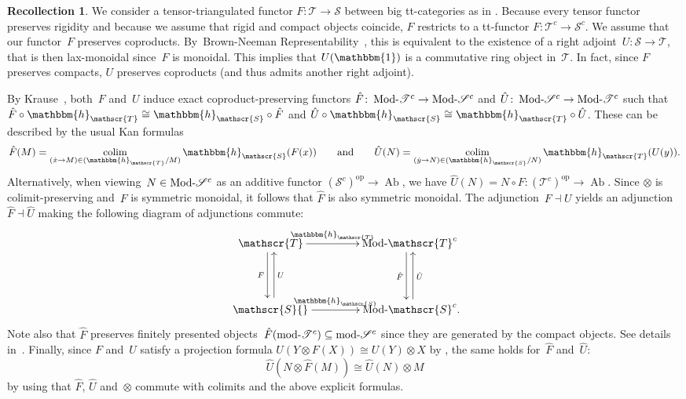 \documentclass[JEP,XML,SOM,Unicode]{cedram}
\numberwithin{equation}{section}
\theoremstyle{definition}
\newtheorem{Rec}[equation]{Recollection}
\DeclareMathOperator{\colim}{colim}
\DeclareMathOperator{\opname}{op}
\newcommand{\cat}[1]{\mathscr{#1}}
\newcommand{\op}{^{\opname}}
\newcommand{\unit}{\mathbbm{1}}
\DeclareMathOperator{\Ab}{Ab}
\DeclareMathOperator{\modname}{mod}
\DeclareMathOperator{\Mod}{Mod}
\newcommand{\adj}{\dashv}
\newcommand{\cS}{\cat{S}}
\newcommand{\cT}{\cat{T}}
\newcommand{\modd}{\modname\text{\!-}}
\newcommand{\Modd}{\Mod\text{\!-}}
\newcommand{\MS}{\Modd\cat S^c}
\newcommand{\mS}{\modd\cat S^c}
\newcommand{\MT}{\Modd\cat T^c}
\newcommand{\mT}{\modd\cat T^c}
\newcommand{\qquadtext}[1]{\qquad\text{#1}\qquad}
\newcommand{\vcorrect}[1]{{\vphantom{\vbox to #1em{}}}}
\newcommand{\yoneda}{\mathbbm{h}}
\begin{document}
\begin{Rec}
\label{Rec:T-S}
We consider a tensor-triangulated functor $F\colon \cT\to \cS$ between big tt-categories as in . Because every tensor functor preserves rigidity and because we assume that rigid and compact objects coincide, $F$ restricts to a tt\nobreakdash-functor $F\colon \cT^c\to \cS^c$. We assume that our functor~$F$ preserves coproducts. By~Brown-Neeman Representability~\cite{Neeman96}, this is equivalent to the existence of a right adjoint~$U\colon \cS\to \cT$, that is then lax-monoidal since~$F$ is monoidal. This implies that $U(\unit)$ is a commutative ring object in~$\cT$. In fact, since $F$ preserves compacts, $U$ preserves coproducts (and thus admits another right adjoint).

By Krause~\cite[Cor.\,2.4]{Krause00}, both~$F$ and~$U$ induce exact coproduct-preserving functors $\hat F\colon \MT\to \MS$ and $\hat U\colon \MS\to \MT$ such that $\hat F\circ \yoneda_\cT\cong \yoneda_\cS\circ \hat F$ and $\hat U\circ \yoneda_\cS\cong \yoneda_\cT\circ \hat U$. These can be described by the usual Kan formulas
\[
\hat F(M)=\mathop{\colim}_{(\hat x\to M)\in (\yoneda_\cT/M)}\yoneda_\cS(F(x))
\qquadtext{and}
\hat U(N)=\mathop{\colim}_{(\hat y\to N)\in (\yoneda_\cS/N)}\yoneda_\cT(U(y)).
\]
Alternatively, when viewing~$N\in\MS$ as an additive functor $(\cS^c)\op\to \Ab$, we have $\hat U(N)=N\circ F\colon (\cT^c)\op\to \Ab$. Since $\otimes$ is colimit-preserving and~$F$ is symmetric monoidal, it follows that $\hat F$ is also symmetric monoidal. The adjunction~$F\adj U$ yields an adjunction~$\hat F\adj \hat U$ making the following diagram of adjunctions commute:
\begin{equation}
\label{eq:hatF-hatU}
\vcenter{\xymatrix@=1.5cm{
\cT \ar@<-.3em>[d]_-{F} \ar[r]^-{\yoneda_\cT}
& \MT \ar@<-.3em>[d]_-{\hat F}
\\
\cS {}^{\vcorrect{.6}} \ar@<-.3em>[u]_-{U} \ar[r]^-{\yoneda_\cS}
& \MS.\!\! {}^{\vcorrect{.6}} \ar@<-.3em>[u]_-{\hat U}
}}
\end{equation}
Note also that $\hat F$ preserves finitely presented objects~$\hat F(\mT)\subseteq\mS$ since they are generated by the compact objects. See details in~\cite[Constr.\,6.10]{BalmerKrauseStevenson19}. Finally, since $F$ and~$U$ satisfy a projection formula $U(Y\otimes F(X))\cong U(Y)\otimes X$ by \cite[2.16]{BalmerDellAmbrogioSanders16}, the same holds for~$\hat F$ and~$\hat U$:
\begin{equation}
\label{eq:proj-formula}
\hat U(N\otimes \hat F(M))\cong \hat U(N)\otimes M
\end{equation}
by using that $\hat F$, $\hat U$ and~$\otimes$ commute with colimits and the above explicit formulas.
\end{Rec}
\end{document}

